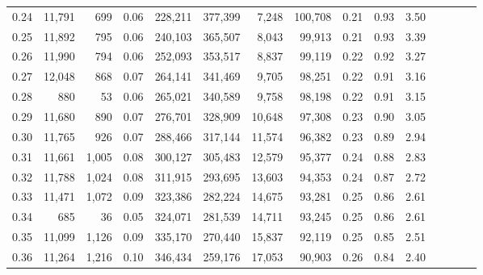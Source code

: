 \begin{tabular}{rrrcrrrrrrrrrrr}
0.24 &  11,791 &    699 &                                       0.06 &  228,211 &  377,399 &    7,248 &  100,708 &  0.21 &  0.93 &                         3.50 \\
0.25 &  11,892 &    795 &                                       0.06 &  240,103 &  365,507 &    8,043 &   99,913 &  0.21 &  0.93 &                         3.39 \\
0.26 &  11,990 &    794 &                                       0.06 &  252,093 &  353,517 &    8,837 &   99,119 &  0.22 &  0.92 &                         3.27 \\
0.27 &  12,048 &    868 &                                       0.07 &  264,141 &  341,469 &    9,705 &   98,251 &  0.22 &  0.91 &                         3.16 \\
0.28 &     880 &     53 &                                       0.06 &  265,021 &  340,589 &    9,758 &   98,198 &  0.22 &  0.91 &                         3.15 \\
0.29 &  11,680 &    890 &                                       0.07 &  276,701 &  328,909 &   10,648 &   97,308 &  0.23 &  0.90 &                         3.05 \\
0.30 &  11,765 &    926 &                                       0.07 &  288,466 &  317,144 &   11,574 &   96,382 &  0.23 &  0.89 &                         2.94 \\
0.31 &  11,661 &  1,005 &                                       0.08 &  300,127 &  305,483 &   12,579 &   95,377 &  0.24 &  0.88 &                         2.83 \\
0.32 &  11,788 &  1,024 &                                       0.08 &  311,915 &  293,695 &   13,603 &   94,353 &  0.24 &  0.87 &                         2.72 \\
0.33 &  11,471 &  1,072 &                                       0.09 &  323,386 &  282,224 &   14,675 &   93,281 &  0.25 &  0.86 &                         2.61 \\
0.34 &     685 &     36 &                                       0.05 &  324,071 &  281,539 &   14,711 &   93,245 &  0.25 &  0.86 &                         2.61 \\
0.35 &  11,099 &  1,126 &                                       0.09 &  335,170 &  270,440 &   15,837 &   92,119 &  0.25 &  0.85 &                         2.51 \\
0.36 &  11,264 &  1,216 &                                       0.10 &  346,434 &  259,176 &   17,053 &   90,903 &  0.26 &  0.84 &                         2.40 \\

\end{tabular}

